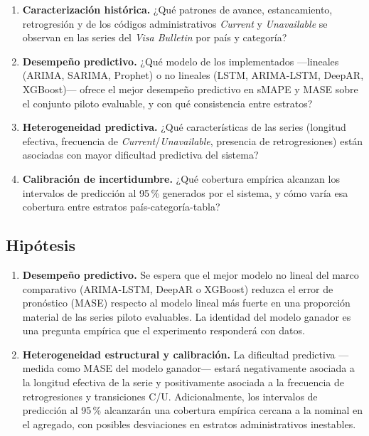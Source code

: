 \documentclass[12pt,letterpaper]{report}
\begin{document}
\begin{enumerate}[label=PE\arabic*., leftmargin=1.4cm, itemsep=4pt]
    \item \textbf{Caracterización histórica.} ¿Qué patrones de avance, estancamiento, retrogresión y de los códigos administrativos \textit{Current} y \textit{Unavailable} se observan en las series del \textit{Visa Bulletin} por país y categoría?
    \item \textbf{Desempeño predictivo.} ¿Qué modelo de los implementados ---lineales (ARIMA, SARIMA, Prophet) o no lineales (LSTM, ARIMA-LSTM, DeepAR, XGBoost)--- ofrece el mejor desempeño predictivo en sMAPE y MASE sobre el conjunto piloto evaluable, y con qué consistencia entre estratos?
    \item \textbf{Heterogeneidad predictiva.} ¿Qué características de las series (longitud efectiva, frecuencia de \textit{Current}/\textit{Unavailable}, presencia de retrogresiones) están asociadas con mayor dificultad predictiva del sistema?
    \item \textbf{Calibración de incertidumbre.} ¿Qué cobertura empírica alcanzan los intervalos de predicción al 95\,\% generados por el sistema, y cómo varía esa cobertura entre estratos país-categoría-tabla?
\end{enumerate}

\subsection*{Hipótesis}

\begin{enumerate}[label=H\arabic*., leftmargin=1.2cm, itemsep=4pt]
    \item \textbf{Desempeño predictivo.} Se espera que el mejor modelo no lineal del marco comparativo (ARIMA-LSTM, DeepAR o XGBoost) reduzca el error de pronóstico (MASE) respecto al modelo lineal más fuerte en una proporción material de las series piloto evaluables. La identidad del modelo ganador es una pregunta empírica que el experimento responderá con datos.
    \item \textbf{Heterogeneidad estructural y calibración.} La dificultad predictiva ---medida como MASE del modelo ganador--- estará negativamente asociada a la longitud efectiva de la serie y positivamente asociada a la frecuencia de retrogresiones y transiciones C/U. Adicionalmente, los intervalos de predicción al 95\,\% alcanzarán una cobertura empírica cercana a la nominal en el agregado, con posibles desviaciones en estratos administrativos inestables.
\end{enumerate}
\end{document}
